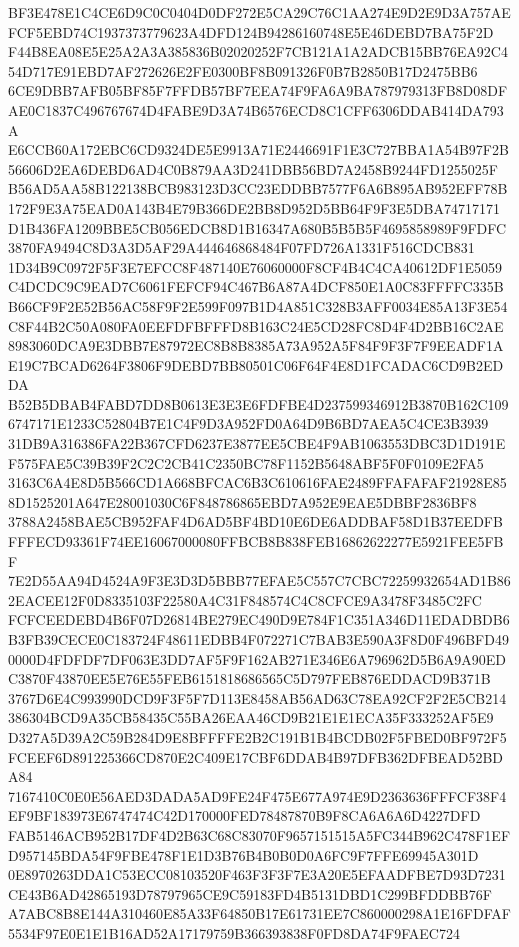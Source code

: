 \documentclass[UTF8,fontset=fandol,zihao=-4,a4paper]{ctexart}
\begin{document}
{{BF3E478E1C4CE6D9C0C0404D0DF272E5CA29C76C1AA274E9D2E9D3A757AEFCF5EBD74C1937373779623A4DFD124B94286160748E5E46DEBD7BA75F2D
F44B8EA08E5E25A2A3A385836B02020252F7CB121A1A2ADCB15BB76EA92C454D717E91EBD7AF272626E2FE0300BF8B091326F0B7B2850B17D2475BB6
6CE9DBB7AFB05BF85F7FFDB57BF7EEA74F9FA6A9BA787979313FB8D08DFAE0C1837C496767674D4FABE9D3A74B6576ECD8C1CFF6306DDAB414DA793A
E6CCB60A172EBC6CD9324DE5E9913A71E2446691F1E3C727BBA1A54B97F2B56606D2EA6DEBD6AD4C0B879AA3D241DBB56BD7A2458B9244FD1255025F
B56AD5AA58B122138BCB983123D3CC23EDDBB7577F6A6B895AB952EFF78B172F9E3A75EAD0A143B4E79B366DE2BB8D952D5BB64F9F3E5DBA74717171
D1B436FA1209BBE5CB056EDCB8D1B16347A680B5B5B5F4695858989F9FDFC3870FA9494C8D3A3D5AF29A444646868484F07FD726A1331F516CDCB831
1D34B9C0972F5F3E7EFCC8F487140E76060000F8CF4B4C4CA40612DF1E5059C4DCDC9C9EAD7C6061FEFCF94C467B6A87A4DCF850E1A0C83FFFFC335B
B66CF9F2E52B56AC58F9F2E599F097B1D4A851C328B3AFF0034E85A13F3E54C8F44B2C50A080FA0EEFDFBFFFD8B163C24E5CD28FC8D4F4D2BB16C2AE
8983060DCA9E3DBB7E87972EC8B8B8385A73A952A5F84F9F3F7F9EEADF1AE19C7BCAD6264F3806F9DEBD7BB80501C06F64F4E8D1FCADAC6CD9B2EDDA
B52B5DBAB4FABD7DD8B0613E3E3E6FDFBE4D237599346912B3870B162C1096747171E1233C52804B7E1C4F9D3A952FD0A64D9B6BD7AEA5C4CE3B3939
31DB9A316386FA22B367CFD6237E3877EE5CBE4F9AB1063553DBC3D1D191EF575FAE5C39B39F2C2C2CB41C2350BC78F1152B5648ABF5F0F0109E2FA5
3163C6A4E8D5B566CD1A668BFCAC6B3C610616FAE2489FFAFAFAF21928E858D1525201A647E28001030C6F848786865EBD7A952E9EAE5DBBF2836BF8
3788A2458BAE5CB952FAF4D6AD5BF4BD10E6DE6ADDBAF58D1B37EEDFBFFFECD93361F74EE16067000080FFBCB8B838FEB16862622277E5921FEE5FBF
7E2D55AA94D4524A9F3E3D3D5BBB77EFAE5C557C7CBC72259932654AD1B862EACEE12F0D8335103F22580A4C31F848574C4C8CFCE9A3478F3485C2FC
FCFCEEDEBD4B6F07D26814BE279EC490D9E784F1C351A346D11EDADBDB6B3FB39CECE0C183724F48611EDBB4F072271C7BAB3E590A3F8D0F496BFD49
0000D4FDFDF7DF063E3DD7AF5F9F162AB271E346E6A796962D5B6A9A90EDC3870F43870EE5E76E55FEB6151818686565C5D797FEB876EDDACD9B371B
3767D6E4C993990DCD9F3F5F7D113E8458AB56AD63C78EA92CF2F2E5CB214386304BCD9A35CB58435C55BA26EAA46CD9B21E1E1ECA35F333252AF5E9
D327A5D39A2C59B284D9E8BFFFFE2B2C191B1B4BCDB02F5FBED0BF972F5FCEEF6D891225366CD870E2C409E17CBF6DDAB4B97DFB362DFBEAD52BDA84
7167410C0E0E56AED3DADA5AD9FE24F475E677A974E9D2363636FFFCF38F4EF9BF183973E6747474C42D170000FED78487870B9F8CA6A6A6D4227DFD
FAB5146ACB952B17DF4D2B63C68C83070F9657151515A5FC344B962C478F1EFD957145BDA54F9FBE478F1E1D3B76B4B0B0D0A6FC9F7FFE69945A301D
0E8970263DDA1C53ECC08103520F463F3F3F7E3A20E5EFAADFBE7D93D7231CE43B6AD42865193D78797965CE9C59183FD4B5131DBD1C299BFDDBB76F
A7ABC8B8E144A310460E85A33F64850B17E61731EE7C860000298A1E16FDFAF5534F97E0E1E1B16AD52A17179759B366393838F0FD8DA74F9FAEC724
}}
\end{document}
